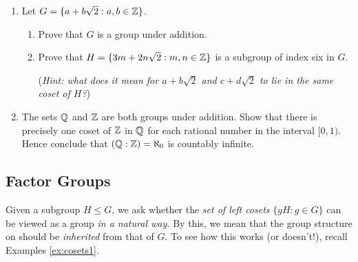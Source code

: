 \begin{exercises}
\begin{enumerate}
			
		\item\label{exs:zsqrt2subgroup} Let $G=\{a+b\sqrt 2:a,b\in\mathbb{Z}\}$.
		\begin{enumerate}
		  \item Prove that $G$ is a group under addition.
		  \item Prove that $H=\{3m+2n\sqrt 2:m,n\in\mathbb{Z}\}$ is a subgroup of index six in $G$.\par
		  (\emph{Hint: what does it mean for $a+b\sqrt 2$ and $c+d\sqrt 2$ to lie in the same coset of $H$?})
		\end{enumerate}
	  
	  \item\label{exs:zqindex} The sets $\mathbb{Q}$ and $\mathbb{Z}$ are both groups under addition. Show that there is precisely one coset of $\mathbb{Z}$ in $\mathbb{Q}$ for each rational number in the interval $[0,1)$. Hence conclude that $(\mathbb{Q}:\mathbb{Z})=\aleph_0$ is countably infinite.
	
	\end{enumerate}
\end{exercises}


\clearpage

\subsection{Factor Groups}\label{sec:factor}

Given a subgroup $H\le G$, we ask whether the \emph{set of left cosets} $\{gH:g\in G\}$ can be viewed as a group \emph{in a natural way.} By this, we mean that the group structure on should be \emph{inherited} from that of $G$. To see how this works (or doesn't!), recall Examples \ref{ex:cosets1}.


